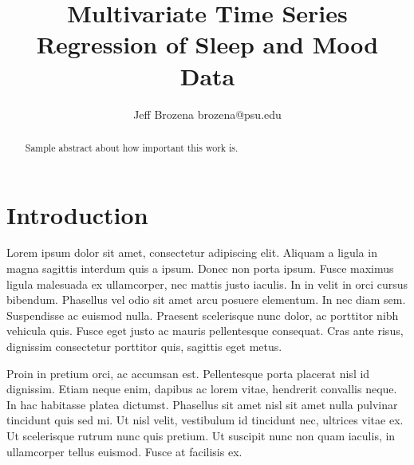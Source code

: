 \documentclass{article}
\begin{document}
\title{Multivariate Time Series Regression of Sleep and Mood Data}

\author{\name Jeff Brozena \email brozena@psu.edu}
\maketitle

\begin{abstract}%
  Sample abstract about how important this work is.
\end{abstract}

\section{Introduction}

\citep{ruwaardEcological}
\citet{ruwaardEcological}
Lorem ipsum dolor sit amet, consectetur adipiscing elit. Aliquam a ligula in magna sagittis interdum quis a ipsum. Donec non porta ipsum. Fusce maximus ligula malesuada ex ullamcorper, nec mattis justo iaculis. In in velit in orci cursus bibendum. Phasellus vel odio sit amet arcu posuere elementum. In nec diam sem. Suspendisse ac euismod nulla. Praesent scelerisque nunc dolor, ac porttitor nibh vehicula quis. Fusce eget justo ac mauris pellentesque consequat. Cras ante risus, dignissim consectetur porttitor quis, sagittis eget metus.

Proin in pretium orci, ac accumsan est. Pellentesque porta placerat nisl id dignissim. Etiam neque enim, dapibus ac lorem vitae, hendrerit convallis neque. In hac habitasse platea dictumst. Phasellus sit amet nisl sit amet nulla pulvinar tincidunt quis sed mi. Ut nisl velit, vestibulum id tincidunt nec, ultrices vitae ex. Ut scelerisque rutrum nunc quis pretium. Ut suscipit nunc non quam iaculis, in ullamcorper tellus euismod. Fusce at facilisis ex.
\end{document}

